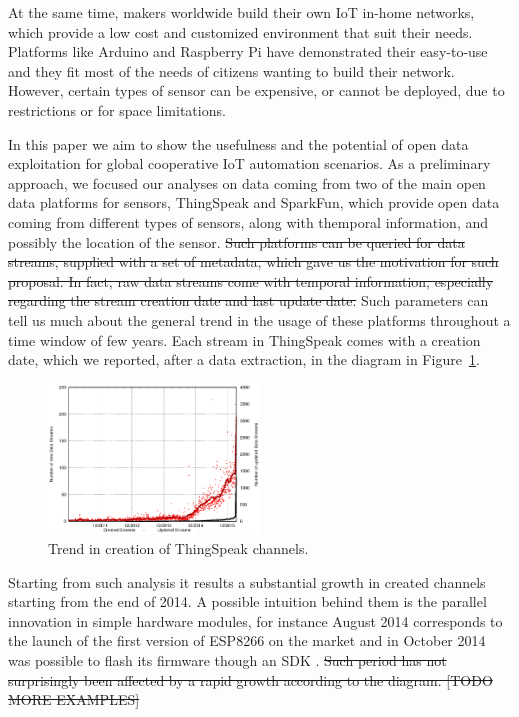 At the same time, makers worldwide build their own IoT in-home networks, which provide a low cost and customized environment that suit their needs. Platforms like Arduino and Raspberry Pi have demonstrated their easy-to-use and they fit most of the needs of citizens wanting to build their network. However, certain types of sensor can be expensive, or cannot be deployed, due to restrictions or for space limitations. 

In this paper we aim to show the usefulness and the potential of open data exploitation for global cooperative IoT automation scenarios.
As a preliminary approach, we focused our analyses on data coming from two of the main open data platforms for sensors, ThingSpeak and SparkFun, which provide open data coming from different types of sensors, along with themporal information, and possibly the location of the sensor.
\st{Such platforms can be queried for data streams, supplied with a set of metadata, which gave us the motivation for such proposal.
In fact, raw data streams come with temporal information, especially regarding the stream creation date and last update date.}
Such parameters can tell us much about the general trend in the usage of these platforms throughout a time window of few years.
Each stream in ThingSpeak comes with a creation date, which we reported, after a data extraction, in the diagram in Figure~\ref{creationtrend}.
\begin{figure}[hbtp]
\centering
\includegraphics[width=0.50\textwidth]{img/bars.eps} 
\caption{Trend in creation of ThingSpeak channels.}
\label{creationtrend}
\end{figure}
Starting from such analysis it results a substantial growth in created channels starting from the end of 2014. 
A possible intuition behind them is the parallel innovation in simple hardware modules, for instance August 2014 corresponds to the launch of the first version of ESP8266 \cite{esp8266} on the market and in October 2014 was possible to flash its firmware though an SDK \cite{espressif}.
\st{Such period has not surprisingly been affected by a rapid growth according to the diagram. [TODO MORE EXAMPLES]}
